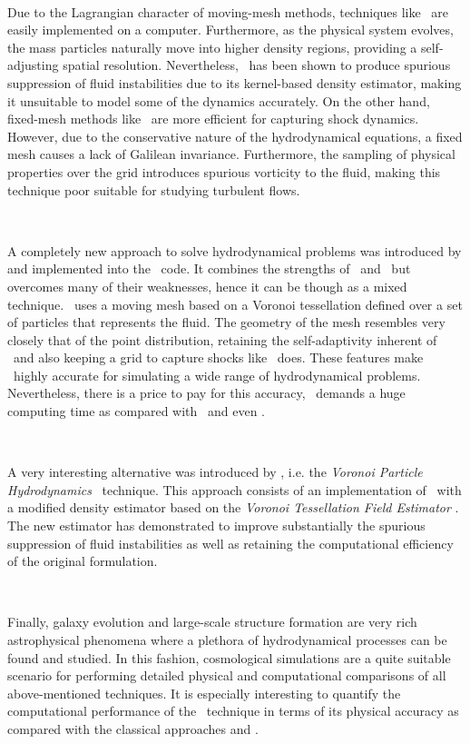 \documentclass[a4,useAMS,usenatbib,usegraphicx,12pt]{article}
\begin{document}
\

Due to the Lagrangian character of moving-mesh methods, techniques like \SPH\ 
are easily implemented on a computer. Furthermore, as the physical system 
evolves, the mass particles naturally move into higher density regions, 
providing a self-adjusting spatial resolution. Nevertheless, \SPH\ has been 
shown to produce spurious suppression of fluid instabilities due to its 
kernel-based density estimator, making it unsuitable to model some of the 
dynamics accurately. On the other hand, fixed-mesh methods like \AMR\ are more 
efficient for capturing shock dynamics. However, due to the conservative nature 
of the hydrodynamical equations, a fixed mesh causes a lack of Galilean 
invariance. Furthermore, the sampling of physical properties over the grid 
introduces spurious vorticity to the fluid, making this technique poor suitable 
for studying turbulent flows.

\

A completely new approach to solve hydrodynamical problems was introduced by 
\citet{Springel10} and implemented into the \AREPO\ code. It combines the 
strengths of \AMR\ and \SPH\ but overcomes many of their weaknesses, hence it 
can be though as a mixed technique. \AREPO\ uses a moving mesh based on a 
Voronoi tessellation defined over a set of particles that represents the fluid. 
The geometry of the mesh resembles very closely that of the point distribution,
retaining the self-adaptivity inherent of \SPH\ and also keeping a grid to 
capture shocks like \AMR\ does. These features make \AREPO\ highly accurate for
simulating a wide range of hydrodynamical problems. Nevertheless, there is a 
price to pay for this accuracy, \AREPO\ demands a huge computing time as 
compared with \SPH\ and even \AMR.

\

A very interesting alternative was introduced by \citet{Hess10}, i.e. the 
\textit{Voronoi Particle Hydrodynamics} \VPH\ technique. This approach consists
of an implementation of \SPH\ with a modified density estimator based on the  
\textit{Voronoi Tessellation Field Estimator} \VTFE. The new estimator
has demonstrated to improve substantially the spurious suppression of fluid 
instabilities as well as retaining the computational efficiency of the original 
formulation.

\

Finally, galaxy evolution and large-scale structure formation are very rich 
astrophysical phenomena where a plethora of hydrodynamical processes can be 
found and studied. In this fashion, cosmological simulations are a quite 
suitable scenario for performing detailed physical and computational 
comparisons of all above-mentioned techniques. It is especially interesting to 
quantify the computational performance of the \VPH\ technique in terms of its 
physical accuracy as compared with the classical approaches and \AREPO.
\end{document}
